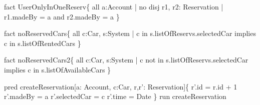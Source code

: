 \documentclass[a4paper]{article}
\begin{document}
fact UserOnlyInOneReserv\{ \newline
\hspace*{5 mm}	all a:Account | no disj r1, r2: Reservation | \newline
\hspace*{5 mm}		r1.madeBy = a and r2.madeBy = a \newline
\} \newline

fact noReservedCars\{ \newline
\hspace*{5 mm}	all c:Car, s:System | \newline
\hspace*{5 mm}	c in s.listOfReservs.selectedCar \newline
\hspace*{5 mm}	implies \newline
\hspace*{5 mm}	c in s.listOfRentedCars \newline
\} \newline

fact noReservedCars2\{ \newline
\hspace*{5 mm}	all c:Car, s:System | \newline
\hspace*{5 mm}	c not in s.listOfReservs.selectedCar \newline
\hspace*{5 mm}	implies \newline
\hspace*{5 mm}	c in s.listOfAvailableCars \newline
\} \newline

pred createReservation[a: Account, c:Car, r,r': Reservation]\{ \newline
\hspace*{5 mm}		r'.id = r.id + 1 \newline
\hspace*{5 mm}		r'.madeBy = a \newline 
\hspace*{5 mm}		r'.selectedCar = c \newline 
\hspace*{5 mm}		r'.time = Date \newline
\} \newline
run createReservation \newline
\end{document}
